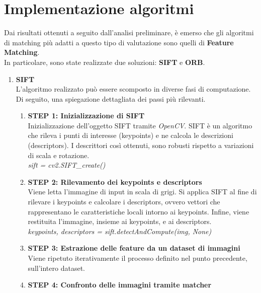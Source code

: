 \documentclass[12pt,a4paper,openright,twoside]{book}
\begin{document}
\section{Implementazione algoritmi}
Dai risultati ottenuti a seguito dall'analisi preliminare, è emerso che gli algoritmi di matching più adatti a questo tipo di valutazione sono quelli di \textbf{Feature Matching}.\\
In particolare, sono state realizzate due soluzioni: \textbf{SIFT} e \textbf{ORB}.
\begin{enumerate}
\item \textbf{SIFT}\\
L'algoritmo realizzato può essere scomposto in diverse fasi di computazione. Di seguito, una spiegazione dettagliata dei passi più rilevanti.
\begin{enumerate}

\item \textbf{STEP 1: Inizializzazione di SIFT}\\
Inizializzazione dell'oggetto SIFT tramite {\itshape OpenCV}. SIFT è un algoritmo che rileva i punti di interesse (keypoints) e ne calcola le descrizioni (descriptors). I descrittori così ottenuti, sono robusti rispetto a variazioni di scala e rotazione.\\

{\itshape sift = cv2.SIFT\_create()}\\

\item \textbf{STEP 2: Rilevamento dei keypoints e descriptors}\\
Viene letta l'immagine di input in scala di grigi. Si applica SIFT al fine di rilevare i keypoints  e calcolare i descriptors, ovvero vettori che rappresentano le caratteristiche locali intorno ai keypoints. Infine, viene restituita l'immagine, insieme ai keypoints, e ai descriptors.\\

{\itshape keypoints, descriptors = sift.detectAndCompute(img, None)}\\

\item \textbf{STEP 3: Estrazione delle feature da un dataset di immagini}\\
Viene ripetuto iterativamente il processo definito nel punto precedente, sull'intero dataset.

\item \textbf{STEP 4: Confronto delle immagini tramite matcher}\\


\end{enumerate}
\end{enumerate}
\end{document}

